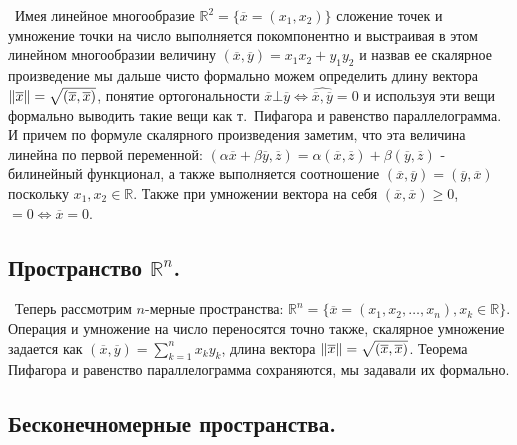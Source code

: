 \medskip 
{}

\medskip
\noindent \textbullet~Имея линейное многообразие $\mathbb{R}^2 = \{ \overline{x} = (x_1, x_2)\}$ сложение точек и умножение точки на число выполняется покомпонентно и 
выстраивая в этом линейном многообразии величину $(\overline{x}, \overline{y}) = x_1 x_2 + y_1 y_2$ и назвав ее скалярное произведение мы дальше чисто формально можем 
определить длину вектора $\left\lVert\overline{x}\right\rVert = \sqrt{(\overline{x}, \overline{x})}$, понятие ортогональности
$\overline{x} \bot \overline{y} \Longleftrightarrow \widehat{\overline{x}, \overline{y}} = 0$ и используя эти вещи формально выводить такие вещи как т.~Пифагора и 
равенство параллелограмма. И причем по формуле скалярного произведения заметим, что эта величина линейна по первой переменной:
$(\alpha \overline{x} + \beta \overline{y}, \overline{z}) = \alpha (\overline{x}, \overline{z}) + \beta (\overline{y}, \overline{z})$ - билинейный функционал, а также 
выполняется соотношение $(\overline{x}, \overline{y}) = (\overline{y}, \overline{x})$ поскольку $x_1, x_2 \in \mathbb{R}$. Также при умножении вектора на себя 
$(\overline{x}, \overline{x}) \ge 0$, $= 0 \Longleftrightarrow \overline{x} = 0$.


\subsection*{Пространство $\mathbb{R}^n$. }

\noindent \textbullet~Теперь рассмотрим $n$-мерные пространства: $\mathbb{R}^n = \{ \overline{x} = (x_1, x_2, \dots, x_n), x_k \in \mathbb{R}\}$. Операция и умножение
на число переносятся точно также, скалярное умножение задается как $(\overline{x}, \overline{y}) = \sum_{k = 1}^n x_k y_k$, длина вектора $\left\lVert\overline{x}\right\rVert = 
\sqrt{(\overline{x}, \overline{x})}$. Теорема Пифагора и равенство параллелограмма сохраняются, мы задавали их формально.


\subsection*{Бесконечномерные пространства. }

